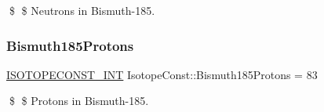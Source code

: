 \$ \$ Neutrons in Bismuth-\/185. \mbox{\label{group___isotope_const-_bismuth-_bi185_ga106c7680cdf940693defac6b24748f87}} 
\subsubsection{\texorpdfstring{Bismuth185\+Protons}{Bismuth185Protons}}
{\footnotesize\ttfamily \mbox{\hyperlink{group___isotope_const-_macros_ga5f18360b3e99483a35c32d789e62621c}{I\+S\+O\+T\+O\+P\+E\+C\+O\+N\+S\+T\+\_\+\+I\+NT}} Isotope\+Const\+::\+Bismuth185\+Protons = 83}

\$ \$ Protons in Bismuth-\/185. 